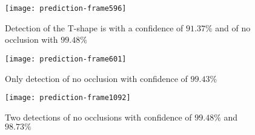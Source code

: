 \begin{figure}[H]
	\centering
	\texttt{[image: prediction-frame596]}
	\caption{Detection of the T-shape is with a confidence of $91.37\%$ and of no occlusion with $99.48\%$}
	\label{fig:T-det}
\end{figure}
\begin{figure}[H]
	\centering
	\texttt{[image: prediction-frame601]}
	\caption{Only detection of no occlusion with confidence of $99.43\%$}
	\label{fig:not-det}
\end{figure}
\begin{figure}[H]
	\centering
	\texttt{[image: prediction-frame1092]}
	\caption{Two detections of no occlusions with confidence of $99.48\%$ and $98.73\%$}
	\label{fig:no-occl-det}
\end{figure}